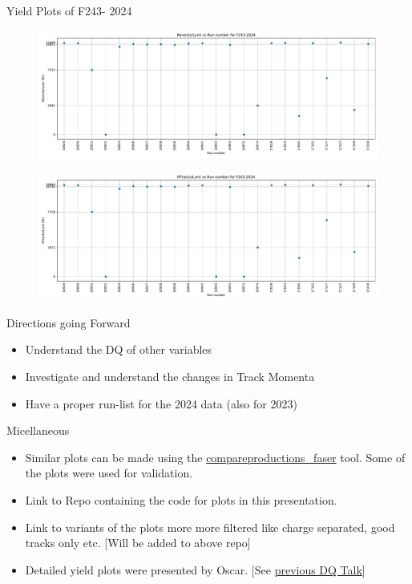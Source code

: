 \begin{frame}{Yield Plots of F243- 2024}
    \begin{figure}
        \centering
        \includegraphics[width=1.0\textwidth]{plots_runwise/NEventsbyLumi_2024_F243.pdf}
    \end{figure}
    \vspace{-0.35cm}
    \begin{figure}
        \centering
        \includegraphics[width=1.0\textwidth]{plots_runwise/NTracksbyLumi_2024_F243.pdf}
    \end{figure}
\end{frame}

\begin{frame}{Directions going Forward}
    \begin{itemize}
        \item Understand the DQ of other variables
        \item Investigate and understand the changes in Track Momenta
        \item Have a proper run-list for the 2024 data (also for 2023)
    \end{itemize}
\end{frame}
\begin{frame}{Micellaneous}
    \begin{itemize}
        \item Similar plots can be made using the \href{https://gitlab.cern.ch/anburger/compareproductions_faser}{compareproductions\_faser} tool. Some of the plots were used for validation.
        \item Link to Repo containing the code for plots in this presentation.
        \item Link to variants of the plots more more filtered like charge separated, good tracks only etc. [Will be added to above repo]
        \item Detailed yield plots were presented by Oscar. [See \href{https://indico.cern.ch/event/1476946/contributions/6220240/attachments/2970435/5227381/DQ2024.pdf}{previous DQ Talk}]
    \end{itemize}
\end{frame}
